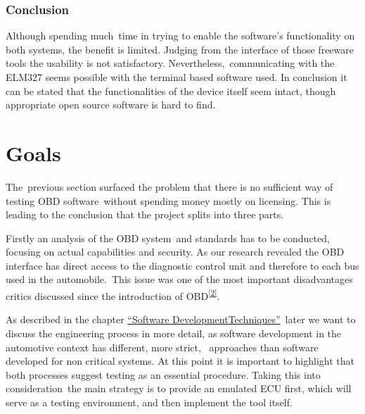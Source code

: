 \hypertarget{h.e4qn0u5p3hu9}{\subsubsection{\texorpdfstring{{Conclusion}}{Conclusion}}\label{h.e4qn0u5p3hu9}}

{Although spending much}{~time in trying to enable the software's
functionality on both systems, the benefit is limited. Judging from the
interface of those freeware tools the usability is not satisfactory.
Nevertheless}{,}{~communicating with the ELM327 seems possible with the
terminal based software used. }{In conclusion }{it can be stated that
the functionalities of the device itself seem intact, though appropriate
open source software is hard to find.}

\hypertarget{h.lzjv4pe0xkgv}{\section{\texorpdfstring{{Goals}}{Goals}}\label{h.lzjv4pe0xkgv}}

{The}{~previous section surfaced the problem that there is no sufficient
way of testing OBD software}{~without spending money mostly on
licensing. This is leading to the conclusion }{that the project splits
into three parts.}

{Firstly an analysis of the OBD system}{~and standards has to be
conducted}{, focusing on actual capabilities and security. As our
research revealed the OBD interface }{has direct access to the
diagnostic control unit and therefore to each bus used in the
automobile.}{~This issue was one of the most important disadvantages
critics discussed since the introduction of
OBD}\textsuperscript{\protect\hyperlink{ftnt2}{{[}2{]}}}{.}

{As described in the chapter
}{\protect\hyperlink{h.totk00jqaso2}{``}}{\protect\hyperlink{h.totk00jqaso2}{Software
Development}}{\protect\hyperlink{h.totk00jqaso2}{Technique}}{\protect\hyperlink{h.totk00jqaso2}{s}}{\protect\hyperlink{h.totk00jqaso2}{''}}{~later
we want to discuss the engineering process }{in }{more detail}{, as
software development in the automotive context has different, more
strict, ~approaches than software developed for non critical systems}{.
At this point it is important to highlight that both processes suggest
testing }{as }{an essential procedure. }{Taking this into
consideration}{~the main strategy is to provide an emulated ECU first,
which will serve as a testing environment}{, and then implement the tool
itself}{.}

